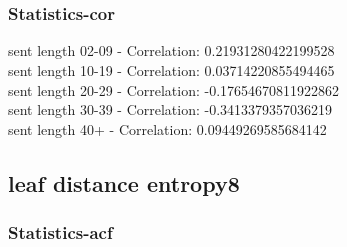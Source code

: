 \documentclass{article}%
\begin{document}
\begin{figure}[ht]%
\centering%
\setlength{\abovecaptionskip}{-35pt}%
%
%
\\%
%
%
\\%
%
\end{figure}

%
\newpage%
\subsubsection{Statistics{-}cor}%
\label{ssubsec:Statistics{-}cor}%
\noindent%
sent length 02-09 - Correlation: 0.21931280422199528\\%
sent length 10-19 - Correlation: 0.03714220855494465\\%
sent length 20-29 - Correlation: -0.17654670811922862\\%
sent length 30-39 - Correlation: -0.3413379357036219\\%
sent length 40+ - Correlation: 0.09449269585684142\\

%
\newpage

%
\subsection{leaf distance entropy8}%
\label{subsec:leafdistanceentropy8}%
\subsubsection{Statistics{-}acf}%
\label{ssubsec:Statistics{-}acf}%
\end{document}
